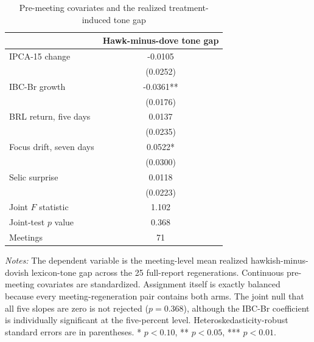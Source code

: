 \begin{table}[htbp]
\color{revisionred}
\centering
\begin{threeparttable}
\caption{Pre-meeting covariates and the realized treatment-induced tone gap}
\label{tab:preassignment-orthogonality}
\begin{footnotesize}
\begin{tabular}{lc}
\toprule
 & Hawk-minus-dove tone gap \\
\midrule
IPCA-15 change & -0.0105 \\
 & (0.0252) \\
IBC-Br growth & -0.0361** \\
 & (0.0176) \\
BRL return, five days & 0.0137 \\
 & (0.0235) \\
Focus drift, seven days & 0.0522* \\
 & (0.0300) \\
Selic surprise & 0.0118 \\
 & (0.0223) \\
\midrule
Joint $F$ statistic & 1.102 \\
Joint-test $p$ value & 0.368 \\
Meetings & 71 \\
\bottomrule
\end{tabular}
\begin{tablenotes}[flushleft]
\scriptsize
\item \textit{Notes:} The dependent variable is the meeting-level mean realized hawkish-minus-dovish lexicon-tone gap across the 25 full-report regenerations. Continuous pre-meeting covariates are standardized. Assignment itself is exactly balanced because every meeting-regeneration pair contains both arms. The joint null that all five slopes are zero is not rejected ($p=0.368$), although the IBC-Br coefficient is individually significant at the five-percent level. Heteroskedasticity-robust standard errors are in parentheses. * $p<0.10$, ** $p<0.05$, *** $p<0.01$.
\end{tablenotes}
\end{footnotesize}
\end{threeparttable}
\end{table}
